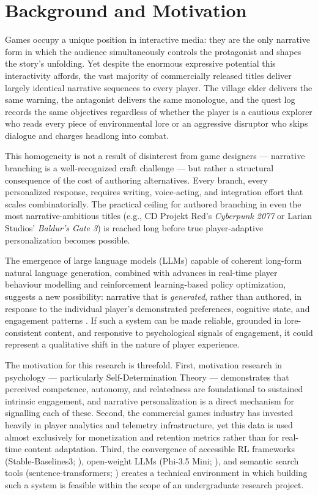 \documentclass[12pt,a4paper]{report}
\begin{document}
\section{Background and Motivation}

Games occupy a unique position in interactive media: they are the only narrative form in which the audience simultaneously controls the protagonist and shapes the story's unfolding. Yet despite the enormous expressive potential this interactivity affords, the vast majority of commercially released titles deliver largely identical narrative sequences to every player. The village elder delivers the same warning, the antagonist delivers the same monologue, and the quest log records the same objectives regardless of whether the player is a cautious explorer who reads every piece of environmental lore or an aggressive disruptor who skips dialogue and charges headlong into combat.

This homogeneity is not a result of disinterest from game designers --- narrative branching is a well-recognized craft challenge --- but rather a structural consequence of the cost of authoring alternatives. Every branch, every personalized response, requires writing, voice-acting, and integration effort that scales combinatorially. The practical ceiling for authored branching in even the most narrative-ambitious titles (e.g., CD Projekt Red's \textit{Cyberpunk 2077} or Larian Studios' \textit{Baldur's Gate 3}) is reached long before true player-adaptive personalization becomes possible.

The emergence of large language models (LLMs) capable of coherent long-form natural language generation, combined with advances in real-time player behaviour modelling and reinforcement learning-based policy optimization, suggests a new possibility: narrative that is \textit{generated}, rather than authored, in response to the individual player's demonstrated preferences, cognitive state, and engagement patterns \citep{brown2020language}. If such a system can be made reliable, grounded in lore-consistent content, and responsive to psychological signals of engagement, it could represent a qualitative shift in the nature of player experience.

The motivation for this research is threefold. First, motivation research in psychology --- particularly Self-Determination Theory \citep{ryan2000self} --- demonstrates that perceived competence, autonomy, and relatedness are foundational to sustained intrinsic engagement, and narrative personalization is a direct mechanism for signalling each of these. Second, the commercial games industry has invested heavily in player analytics and telemetry infrastructure, yet this data is used almost exclusively for monetization and retention metrics rather than for real-time content adaptation. Third, the convergence of accessible RL frameworks (Stable-Baselines3; \citealp{raffin2021stable}), open-weight LLMs (Phi-3.5 Mini; \citealp{microsoft2024phi}), and semantic search tools (sentence-transformers; \citealp{wang2020minilm}) creates a technical environment in which building such a system is feasible within the scope of an undergraduate research project.
\end{document}

